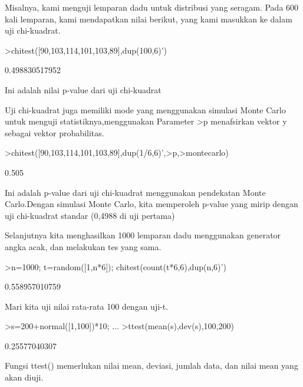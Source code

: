 \documentclass{article}
\begin{document}
\begin{eulernotebook}
\begin{eulercomment}
\begin{eulercomment}
\begin{eulercomment}
Misalnya, kami menguji lemparan dadu untuk distribusi yang seragam.
Pada 600 kali lemparan, kami mendapatkan nilai berikut, yang kami
masukkan ke dalam uji chi-kuadrat.
\end{eulercomment}
\begin{eulerprompt}
>chitest([90,103,114,101,103,89],dup(100,6)')
\end{eulerprompt}
\begin{euleroutput}
  0.498830517952
\end{euleroutput}
\begin{eulercomment}
Ini adalah nilai p-value dari uji chi-kuadrat

Uji chi-kuadrat juga memiliki mode yang menggunakan simulasi Monte
Carlo untuk menguji statistiknya,menggunakan Parameter \textgreater{}p menafsirkan
vektor y sebagai vektor probabilitas.
\end{eulercomment}
\begin{eulerprompt}
>chitest([90,103,114,101,103,89],dup(1/6,6)',>p,>montecarlo)
\end{eulerprompt}
\begin{euleroutput}
  0.505
\end{euleroutput}
\begin{eulercomment}
Ini adalah p-value dari uji chi-kuadrat menggunakan pendekatan Monte
Carlo.Dengan simulasi Monte Carlo, kita memperoleh p-value yang mirip
dengan uji chi-kuadrat standar (0,4988 di uji pertama)

Selanjutnya kita menghasilkan 1000 lemparan dadu menggunakan generator
angka acak, dan melakukan tes yang sama.
\end{eulercomment}
\begin{eulerprompt}
>n=1000; t=random([1,n*6]); chitest(count(t*6,6),dup(n,6)')
\end{eulerprompt}
\begin{euleroutput}
  0.558957010759
\end{euleroutput}
\begin{eulercomment}
Mari kita uji nilai rata-rata 100 dengan uji-t.
\end{eulercomment}
\begin{eulerprompt}
>s=200+normal([1,100])*10; ...
>ttest(mean(s),dev(s),100,200)
\end{eulerprompt}
\begin{euleroutput}
  0.25577040307
\end{euleroutput}
\begin{eulercomment}
Fungsi ttest() memerlukan nilai mean, deviasi, jumlah data, dan nilai
mean yang akan diuji.


\end{eulercomment}
\end{eulercomment}
\end{eulercomment}
\end{eulernotebook}
\end{document}

